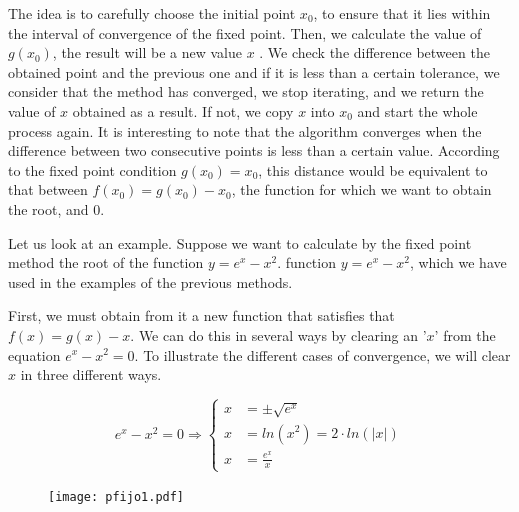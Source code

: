 \begin{paracol}{2}
\switchcolumn

The idea is to carefully choose the initial point $x_0$, to ensure that it lies within the interval of convergence of the fixed point. Then, we calculate the value of $g(x_0)$, the result will be a new value $x$ . We check the difference between the obtained point and the previous one and if it is less than a certain tolerance, we consider that the method has converged, we stop iterating, and we return the value of $x$ obtained as a result. If not, we copy $x$ into $x_0$ and start the whole process again. It is interesting to note that the algorithm converges when the difference between two consecutive points is less than a certain value. According to the fixed point condition $g(x_0)=x_0$, this distance would be equivalent to that between $f(x_0)=g(x_0)-x_0$, the function for which we want to obtain the root, and $0$.

Let us look at an example. Suppose we want to calculate by the fixed point method the root of the function $y=e^x-x^2$. 
function $y=e^x-x^2$, which we have used in the examples of the previous methods.

First, we must obtain from it a new function that satisfies that $f(x)=g(x)-x$. We can do this in several ways by clearing an '$x$' from the equation $e^x-x^2=0$. To illustrate the different cases of convergence, we will clear $x$ in three different ways.


\end{paracol}


\begin{equation*}
e^x-x^2=0 \Rightarrow \left\{
\begin{aligned}
x&=\pm  \sqrt{e^x}\\
x&= ln(x^2)=2\cdot ln(\vert x \vert)\\
x&=\frac{e^x}{x} 
\end{aligned} 
\right.
\end{equation*}

\begin{figure}[h]
\texttt{[image: pfijo1.pdf]}
\label{fig:pfijo01}
\end{figure}

